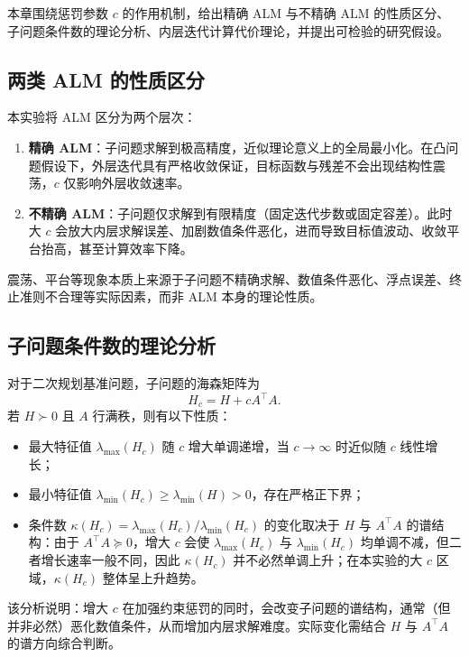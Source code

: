 \documentclass[UTF8]{ctexart}
\numberwithin{figure}{section}
\theoremstyle{definition}
\theoremstyle{examplestyle}
\theoremstyle{remark}
\begin{document}
本章围绕惩罚参数 $c$ 的作用机制，给出精确 ALM 与不精确 ALM 的性质区分、子问题条件数的理论分析、内层迭代计算代价理论，并提出可检验的研究假设。

\subsection{两类 ALM 的性质区分}
\label{sec:alm-types}

本实验将 ALM 区分为两个层次：

\begin{enumerate}
\item \textbf{精确 ALM}：子问题求解到极高精度，近似理论意义上的全局最小化。在凸问题假设下，外层迭代具有严格收敛保证，目标函数与残差不会出现结构性震荡，$c$ 仅影响外层收敛速率。
\item \textbf{不精确 ALM}：子问题仅求解到有限精度（固定迭代步数或固定容差）。此时大 $c$ 会放大内层求解误差、加剧数值条件恶化，进而导致目标值波动、收敛平台抬高，甚至计算效率下降。
\end{enumerate}

震荡、平台等现象本质上来源于子问题不精确求解、数值条件恶化、浮点误差、终止准则不合理等实际因素，而非 ALM 本身的理论性质。

\subsection{子问题条件数的理论分析}
\label{sec:condition}

对于二次规划基准问题，子问题的海森矩阵为
\begin{equation}
\label{eq:Hc}
H_c=H+cA^\top A.
\end{equation}
若 $H\succ 0$ 且 $A$ 行满秩，则有以下性质：

\begin{itemize}
\item 最大特征值 $\lambda_{\max}(H_c)$ 随 $c$ 增大单调递增，当 $c\to\infty$ 时近似随 $c$ 线性增长；
\item 最小特征值 $\lambda_{\min}(H_c)\ge\lambda_{\min}(H)>0$，存在严格正下界；
\item 条件数 $\kappa(H_c)=\lambda_{\max}(H_c)/\lambda_{\min}(H_c)$ 的变化取决于 $H$ 与 $A^\top A$ 的谱结构：由于 $A^\top A\succeq0$，增大 $c$ 会使 $\lambda_{\max}(H_c)$ 与 $\lambda_{\min}(H_c)$ 均单调不减，但二者增长速率一般不同，因此 $\kappa(H_c)$ 并不必然单调上升；在本实验的大 $c$ 区域，$\kappa(H_c)$ 整体呈上升趋势。
\end{itemize}

该分析说明：增大 $c$ 在加强约束惩罚的同时，会改变子问题的谱结构，通常（但并非必然）恶化数值条件，从而增加内层求解难度。实际变化需结合 $H$ 与 $A^\top A$ 的谱方向综合判断。
\end{document}
